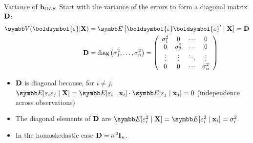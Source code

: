 \documentclass[aspectratio=169,11pt]{beamer}
\begin{document}
\begin{frame}{Variance of ${\bf b}_{OLS}$}
Start with the variance of the errors to form a \alert{diagonal} matrix ${\bf D}$:
\begin{align*}
\Var ( \boldsymbol{\varepsilon} | {\bf X} ) &= \E \left[ \boldsymbol{\varepsilon} \boldsymbol{\varepsilon}' \mid {\bf X} \right] = {\bf D}\\
{\bf D} &= \operatorname { diag } \left( \sigma _ { 1 } ^ { 2 } , \ldots , \sigma _ { n } ^ { 2 } \right) = \left( \begin{array} { c c c c } { \sigma _ { 1 } ^ { 2 } } & { 0 } & { \cdots } & { 0 } \\ { 0 } & { \sigma _ { 2 } ^ { 2 } } & { \cdots } & { 0 } \\ { \vdots } & { \vdots } & { \ddots } & { \vdots } \\ { 0 } & { 0 } & { \cdots } & { \sigma _ { n } ^ { 2 } } \end{array} \right)
\end{align*}
\begin{itemize}
\item ${\bf D}$ is diagonal because, for $i \ne j$, $\E[\varepsilon_i \varepsilon_j \mid  {\bf X}] = \E[\varepsilon_i  \mid {\bf x}_i] \cdot \E[\varepsilon_j  \mid  {\bf x}_j]=0$ (independence across observations)
\item The diagonal elements of ${\bf D}$ are $\E[\varepsilon_i^2 \mid  {\bf X}] = \E[\varepsilon_i^2 \mid {\bf x}_i] = \sigma_i^2$.
\item In the \alert{homoskedastic} case ${\bf D} = \sigma^2 {\bf I}_n$.
\end{itemize}
\end{frame}
\end{document}
